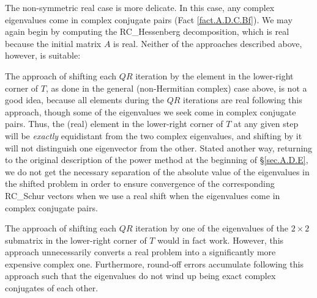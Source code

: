 \begin{figure*}[t]
\end{figure*}


\noindent The non-symmetric real case is more delicate.  In this case, any complex eigenvalues come in complex conjugate pairs (Fact \ref{fact.A.D.C.Bf}).
We may again begin by computing the RC_Hessenberg decomposition, which is real because the initial matrix $A$ is real.  Neither of the approaches described above, however, is suitable:
\beginmylistb
\item The approach of shifting each $QR$ iteration by the element in the lower-right corner of $T$, as done in the general (non-Hermitian complex) case above, is
not a good idea, because all elements during the $QR$ iterations are real following this approach, though some of the eigenvalues we seek come in complex conjugate pairs.
Thus, the (real) element in the lower-right corner of $T$ at any given step
will be {\it exactly} equidistant from the two complex eigenvalues, and shifting by it will not distinguish one eigenvector from the other.  Stated another way,
returning to the original description of the power method at the beginning of \S \ref{sec.A.D.E}, we do not get the necessary separation of the absolute value of the eigenvalues in the shifted problem
in order to ensure convergence of the corresponding RC_Schur vectors when we use a real shift when the eigenvalues come in complex conjugate pairs. 
\item The approach of shifting each $QR$ iteration by one of the eigenvalues of the $2\times 2$ submatrix in the
lower-right corner of $T$ would in fact work.  However, this approach unnecessarily converts a real problem into a significantly more expensive complex one.  Furthermore, round-off errors accumulate following this approach
such that the eigenvalues do not wind up being exact complex conjugates of each other.
\endmylist

